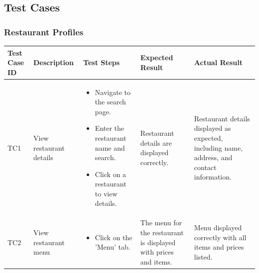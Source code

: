 \documentclass[12pt, a4paper, oneside]{article}
\begin{document}
\subsection{Test Cases}

\subsubsection{Restaurant Profiles}
\captionsetup{type=table}
\begin{tabularx}{\textwidth}{|X|X|X|X|X|}
	\hline
	\rowcolor{gray}
	\textbf{Test Case ID} & \textbf{Description} & \textbf{Test Steps} & \textbf{Expected Result} & \textbf{Actual Result} \\ \hline
	TC1 & View restaurant details & 
    \begin{itemize}[left=0pt, nosep]
        \item Navigate to the search page.
        \item Enter the restaurant name and search.
        \item Click on a restaurant to view details.
    \end{itemize}
    & Restaurant details are displayed correctly. & Restaurant details displayed as expected, including name, address, and contact information. \\ \hline
	TC2 & View restaurant menu & 
    \begin{itemize}[left=0pt, nosep]
        \item Click on the 'Menu' tab.
    \end{itemize}
    & The menu for the restaurant is displayed with prices and items. & Menu displayed correctly with all items and prices listed. \\ \hline
\end{tabularx}
\label{tab:restaurant-profiles}
\end{document}
